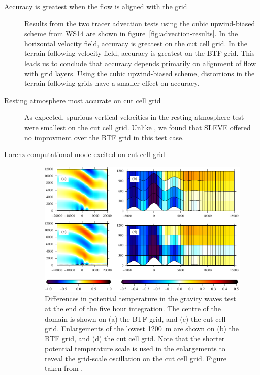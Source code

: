 \documentclass[a4paper]{article}
\begin{document}
\begin{description}
	\item[Accuracy is greatest when the flow is aligned with the grid]{Results from the two tracer advection tests using the cubic upwind-biased scheme from WS14 are shown in figure~\ref{fig:advection-results}.  In the horizontal velocity field, accuracy is greatest on the cut cell grid.  In the terrain following velocity field, accuracy is greatest on the BTF grid.  This leads us to conclude that accuracy depends primarily on alignment of flow with grid layers.  Using the cubic upwind-biased scheme, distortions in the terrain following grids have a smaller effect on accuracy.}

	\item[Resting atmosphere most accurate on cut cell grid]{As expected, spurious vertical velocities in the resting atmosphere test were smallest on the cut cell grid.  Unlike \citet{klemp2011}, we found that SLEVE offered no improvment over the BTF grid in this test case.}
	
	\item[Lorenz computational mode excited on cut cell grid]{
\begin{figure}
	\centering
	\includegraphics[width=5in]{fig-gravityWaves-theta.pdf}
%
	\caption{Differences in potential temperature in the gravity waves test at the end of the five hour integration.  The centre of the domain is shown on (a) the BTF grid, and (c) the cut cell grid.  Enlargements of the lowest \SI{1200}{\meter} are shown on (b) the BTF grid, and (d) the cut cell grid.  Note that the shorter potential temperature scale is used in the enlargements to reveal the grid-scale oscillation on the cut cell grid.  Figure taken from \citet{shaw-weller2015}.}
	\label{fig:gw-thetaDiff}
\end{figure}

}
\end{description}
\end{document}
